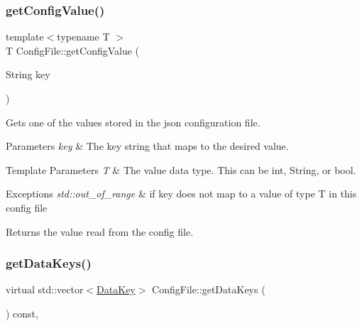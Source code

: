 \subsubsection{\texorpdfstring{get\+Config\+Value()}{getConfigValue()}}
{\footnotesize\ttfamily template$<$typename T $>$ \\
T Config\+File\+::get\+Config\+Value (\begin{DoxyParamCaption}\item[{String}]{key }\end{DoxyParamCaption})\hspace{0.3cm}{\ttfamily [inline]}}

Gets one of the values stored in the json configuration file.


\begin{DoxyParams}{Parameters}
{\em key} & The key string that maps to the desired value.\\
\hline
\end{DoxyParams}

\begin{DoxyTemplParams}{Template Parameters}
{\em T} & The value data type. This can be int, String, or bool.\\
\hline
\end{DoxyTemplParams}

\begin{DoxyExceptions}{Exceptions}
{\em std\+::out\+\_\+of\+\_\+range} & if key does not map to a value of type T in this config file\\
\hline
\end{DoxyExceptions}
\begin{DoxyReturn}{Returns}
the value read from the config file. 
\end{DoxyReturn}
\mbox{\label{classConfigFile_a68a698b58c68f5e3a4d9ba8a81a82688}} 
\subsubsection{\texorpdfstring{get\+Data\+Keys()}{getDataKeys()}}
{\footnotesize\ttfamily virtual std\+::vector$<$\mbox{\hyperlink{structConfigFile_1_1DataKey}{Data\+Key}}$>$ Config\+File\+::get\+Data\+Keys (\begin{DoxyParamCaption}{ }\end{DoxyParamCaption}) const\hspace{0.3cm}{\ttfamily [protected]}, {}}

